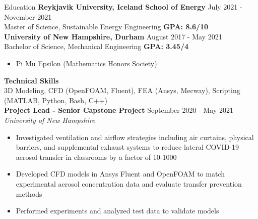 \documentclass{resume}
\begin{document}
\begin{rSection}{Education}
    {\bf Reykjavik University, Iceland School of Energy} \hfill {July 2021 - November 2021}
    \\ {Master of Science, Sustainable Energy Engineering} \hfill {\bf{GPA: 8.6/10}}
    \\ {\bf University of New Hampshire, Durham} \hfill {August 2017 - May 2021}
    \\ {Bachelor of Science, Mechanical Engineering} \hfill {\bf GPA: 3.45/4}
    \vspace{-0.5em}
    \begin{itemize}[label={\tiny\raisebox{1ex}{\textbullet}}, noitemsep]
        \item Pi Mu Epsilon (Mathematics Honors Society)
    \end{itemize}{}
    \vspace{-0.4em}
    {\bf Technical Skills}
    \\ 3D Modeling, CFD (OpenFOAM, Fluent), FEA (Ansys, Mecway), Scripting (MATLAB, Python, Bash, C++)
    \\ {\bf Project Lead - Senior Capstone Project} \hfill {September 2020 - May 2021}
    \\ {\em University of New Hampshire}
    \vspace{-0.5em}
    \begin{itemize}[label={\tiny\raisebox{1ex}{\textbullet}}, noitemsep]
        \item Investigated ventilation and airflow strategies including air curtains, physical barriers, and supplemental exhaust systems to reduce lateral COVID-19 aerosol transfer in classrooms by a factor of 10-1000
        \item Developed CFD models in Ansys Fluent and OpenFOAM to match experimental aerosol concentration data and evaluate transfer prevention methods
        \item Performed experiments and analyzed test data to validate models 
    \end{itemize}
    \vspace{-0.4em}
\end{rSection}
\end{document}
